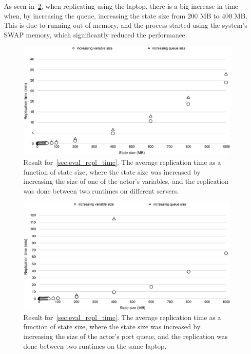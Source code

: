 \documentclass{cslthse-msc}
\begin{document}
As seen in~\cref{fig:replication_time_laptop}, when replicating using the laptop, there is a big increase in time when, by increasing the queue, increasing the state size from 200 MB to 400 MB. This is due to running out of memory, and the process started using the system's SWAP memory, which significantly reduced the performance. 

\begin{figure}[hbt!]
\centering
\includegraphics[scale=0.5]{images/results/replication_time/server.pdf} 
\caption[Replication time in~\cref{sec:eval_repl_time}, server-server]{Result for~\cref{sec:eval_repl_time}. The average replication time as a function of state size, where the state size was increased by increasing the size of one of the actor's variables, and the replication was done between two runtimes on different servers.} \label{fig:replication_time_server}
\end{figure}

\begin{figure}[hbt!]
\centering
\includegraphics[scale=0.5]{images/results/replication_time/laptop.pdf} 
\caption[Replication time in~\cref{sec:eval_repl_time}, laptop-laptop]{Result for~\cref{sec:eval_repl_time}. The average replication time as a function of state size, where the state size was increased by increasing the size of the actor's port queue, and the replication was done between two runtimes on the same laptop.} \label{fig:replication_time_laptop}
\end{figure}
\end{document}
